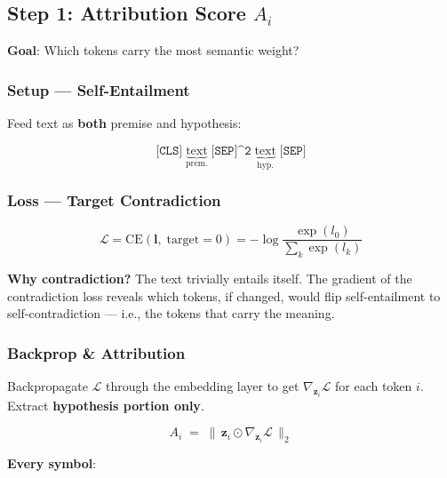\documentclass[10pt,a4paper,twocolumn]{article}
\begin{document}
\subsection{Step 1: Attribution Score $A_i$}

\textbf{Goal}: Which tokens carry the most semantic weight?

\subsubsection{Setup --- Self-Entailment}

Feed text as \textbf{both} premise and hypothesis:

{\small
\[
\texttt{[CLS]}\;\underbrace{\text{text}}_{\text{prem.}}\;\texttt{[SEP]^2}\;\underbrace{\text{text}}_{\text{hyp.}}\;\texttt{[SEP]}
\]
}

\subsubsection{Loss --- Target Contradiction}

\begin{mathbox}[title=Contradiction Loss]
\[
\mathcal{L} = \text{CE}(\bm{l},\;\text{target}{=}0) = -\log\frac{\exp(l_0)}{\sum_k \exp(l_k)}
\]
\end{mathbox}

\textbf{Why contradiction?} The text trivially entails itself. The gradient of the contradiction loss reveals which tokens, if changed, would flip self-entailment to self-contradiction --- i.e., the tokens that carry the meaning.

\subsubsection{Backprop \& Attribution}

Backpropagate $\mathcal{L}$ through the embedding layer to get $\nabla_{\bm{z}_i}\mathcal{L}$ for each token $i$. Extract \textbf{hypothesis portion only}.

\begin{mathbox}[title=Attribution Score]
\[
A_i \;=\; \bigl\lVert\, \bm{z}_i \odot \nabla_{\!\bm{z}_i}\mathcal{L} \,\bigr\rVert_2
\]
\end{mathbox}

\textbf{Every symbol}:
\end{document}
